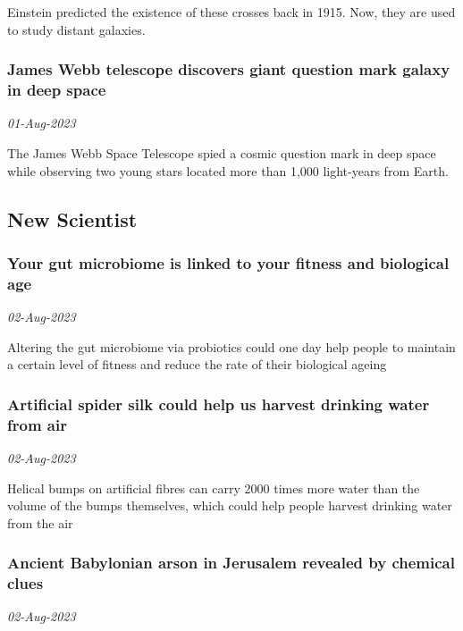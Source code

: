 Einstein predicted the existence of these crosses back in 1915. Now, they are used to study distant galaxies.
\subsubsection{James Webb telescope discovers giant question mark galaxy in deep space \href{https://www.livescience.com/space/james-webb-telescope-discovers-giant-question-mark-galaxy-in-deep-space}{}}
\textit{01-Aug-2023}

The James Webb Space Telescope spied a cosmic question mark in deep space while observing two young stars located more than 1,000 light-years from Earth.
\subsection{New Scientist \href{https://www.newscientist.com/}{}}
\subsubsection{Your gut microbiome is linked to your fitness and biological age \href{https://www.newscientist.com/article/2385367-your-gut-microbiome-is-linked-to-your-fitness-and-biological-age/?utm_campaign=RSS%7CNSNS&utm_source=NSNS&utm_medium=RSS&utm_content=home}{\ding{225}}}
\textit{02-Aug-2023}

Altering the gut microbiome via probiotics could one day help people to maintain a certain level of fitness and reduce the rate of their biological ageing
\subsubsection{Artificial spider silk could help us harvest drinking water from air \href{https://www.newscientist.com/article/2384658-artificial-spider-silk-could-help-us-harvest-drinking-water-from-air/?utm_campaign=RSS%7CNSNS&utm_source=NSNS&utm_medium=RSS&utm_content=home}{\ding{225}}}
\textit{02-Aug-2023}

Helical bumps on artificial fibres can carry 2000 times more water than the volume of the bumps themselves, which could help people harvest drinking water from the air
\subsubsection{Ancient Babylonian arson in Jerusalem revealed by chemical clues \href{https://www.newscientist.com/article/2385449-ancient-babylonian-arson-in-jerusalem-revealed-by-chemical-clues/?utm_campaign=RSS%7CNSNS&utm_source=NSNS&utm_medium=RSS&utm_content=home}{}}
\textit{02-Aug-2023}

